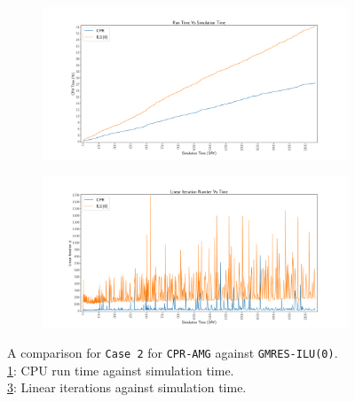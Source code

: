 \begin{figure}
\centering
\begin{subfigure}[b]{\textwidth}
   \includegraphics[width=1\linewidth]{figures/case2/cpu_time.pdf}
   \caption{}
   \label{case2_cpu}
\end{subfigure}

\begin{subfigure}[b]{\textwidth}
   \includegraphics[width=1\linewidth]{figures/case2/its_time.pdf}
   \caption{}
   \label{case2_its}
\end{subfigure}

\caption[caption]{A comparison for \texttt{Case 2} for \texttt{CPR-AMG} against \texttt{GMRES-ILU(0)}.\\\hspace{\textwidth}
	\cref{case2_cpu}: CPU run time against simulation time. \\\hspace{\textwidth}
	\cref{case2_its}: Linear iterations against simulation time.\\\hspace{\textwidth}}
\end{figure}

